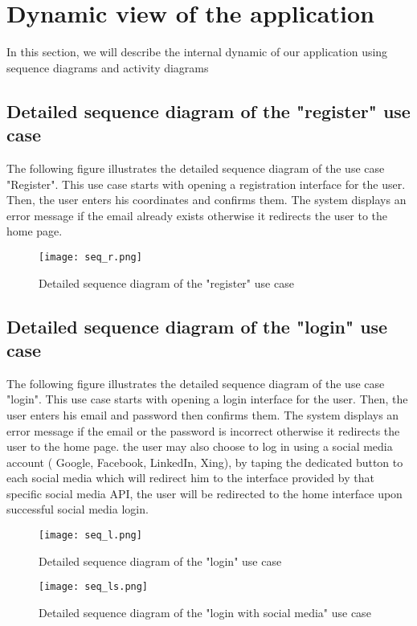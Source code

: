 \section{Dynamic view of the application}
In this section, we will describe the internal dynamic of our application using sequence diagrams and activity diagrams
\subsection{Detailed sequence diagram of the "register" use case}
The following figure illustrates the detailed sequence diagram of the use case
"Register".
This use case starts with opening a registration interface
for the user. Then, the user enters his coordinates and confirms them.
The system displays an error message if the email already exists otherwise it redirects
the user to the home page. 
\begin{figure}[H]%
    \center   
    \texttt{[image: seq\_r.png]}
    \caption{Detailed sequence diagram of the "register" use case}
\end{figure}
\subsection{Detailed sequence diagram of the "login" use case}
The following figure illustrates the detailed sequence diagram of the use case
"login".
This use case starts with opening a login interface
for the user. Then, the user enters his email and password then confirms them.
The system displays an error message if the email or the password is incorrect otherwise it redirects
the user to the home page.
the user may also choose to log in using a social media account ( Google, Facebook, LinkedIn, Xing), by taping the dedicated button to each social media which will redirect him to the interface provided by that specific social media API, the user will be redirected to the home interface upon successful social media login.
  \begin{figure}[H]%
    \center   
    \texttt{[image: seq\_l.png]}
    \caption{Detailed sequence diagram of the "login" use case}
\end{figure}
\begin{figure}[H]%
    \center   
    \texttt{[image: seq\_ls.png]}
    \caption{Detailed sequence diagram of the "login with social media" use case}
\end{figure}
